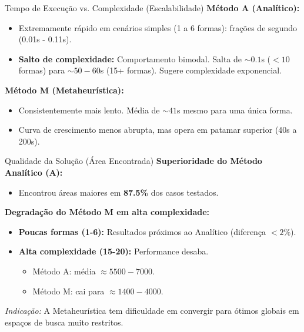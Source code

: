 \documentclass{beamer}
\begin{document}
\begin{frame}{Tempo de Execução vs. Complexidade (Escalabilidade)}
    \textbf{Método A (Analítico):}
    \begin{itemize}
        \item Extremamente rápido em cenários simples (1 a 6 formas): frações de segundo (0.01s - 0.11s).
        \item \textbf{Salto de complexidade:} Comportamento bimodal. Salta de $\sim 0.1$s ($<10$ formas) para $\sim 50-60$s (15+ formas). Sugere complexidade exponencial.
    \end{itemize}

    \vspace{0.5cm}
    \textbf{Método M (Metaheurística):}
    \begin{itemize}
        \item Consistentemente mais lento. Média de $\sim 41$s mesmo para uma única forma.
        \item Curva de crescimento menos abrupta, mas opera em patamar superior (40s a 200s).
    \end{itemize}
\end{frame}

\begin{frame}{Qualidade da Solução (Área Encontrada)}
    \textbf{Superioridade do Método Analítico (A):}
    \begin{itemize}
        \item Encontrou áreas maiores em \textbf{87.5\%} dos casos testados.
    \end{itemize}

    \vspace{0.3cm}
    \textbf{Degradação do Método M em alta complexidade:}
    \begin{itemize}
        \item \textbf{Poucas formas (1-6):} Resultados próximos ao Analítico (diferença $< 2\%$).
        \item \textbf{Alta complexidade (15-20):} Performance desaba.
        \begin{itemize}
            \item Método A: média $\approx 5500-7000$.
            \item Método M: cai para $\approx 1400-4000$.
        \end{itemize}
    \end{itemize}
    
    \vspace{0.2cm}
    \textit{Indicação:} A Metaheurística tem dificuldade em convergir para ótimos globais em espaços de busca muito restritos.
\end{frame}
\end{document}
